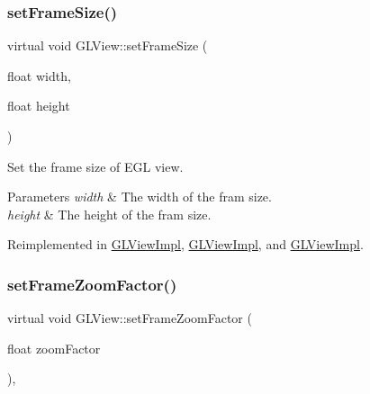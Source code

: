 \mbox{\label{classGLView_a9d6aa2c05e70f0b748049c0c057ff603}} 
\subsubsection{\texorpdfstring{set\+Frame\+Size()}{setFrameSize()}\hspace{0.1cm}{\footnotesize\ttfamily [2/2]}}
{\footnotesize\ttfamily virtual void G\+L\+View\+::set\+Frame\+Size (\begin{DoxyParamCaption}\item[{float}]{width,  }\item[{float}]{height }\end{DoxyParamCaption})\hspace{0.3cm}{\ttfamily [virtual]}}

Set the frame size of E\+GL view.


\begin{DoxyParams}{Parameters}
{\em width} & The width of the fram size. \\
\hline
{\em height} & The height of the fram size. \\
\hline
\end{DoxyParams}


Reimplemented in \hyperlink{classGLViewImpl_ab7eed967b49c7807cbaeb186e3df8f1c}{G\+L\+View\+Impl}, \hyperlink{classGLViewImpl_a16286e087255bfe27d0bef183761eaa0}{G\+L\+View\+Impl}, and \hyperlink{classGLViewImpl_a73c722d907a4428983a5059aac85af46}{G\+L\+View\+Impl}.

\mbox{\label{classGLView_afe38f42b6954c9bc29382f411b49f448}} 
\subsubsection{\texorpdfstring{set\+Frame\+Zoom\+Factor()}{setFrameZoomFactor()}\hspace{0.1cm}{\footnotesize\ttfamily [1/2]}}
{\footnotesize\ttfamily virtual void G\+L\+View\+::set\+Frame\+Zoom\+Factor (\begin{DoxyParamCaption}\item[{float}]{zoom\+Factor }\end{DoxyParamCaption})\hspace{0.3cm}{\ttfamily [inline]}, {\ttfamily [virtual]}}

